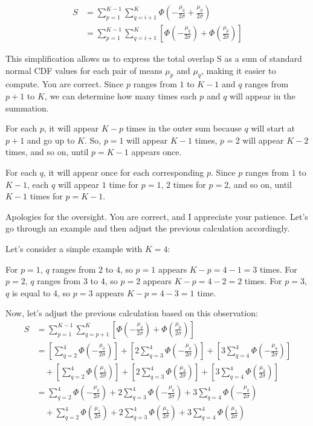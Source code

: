 \documentclass[11pt]{amsart}
\begin{document}
\begin{align*}
S &= \sum_{p=1}^{K-1} \sum_{q=i+1}^K \Phi\left(-\frac{\mu_q}{2 \sigma} + \frac{\mu_p}{2 \sigma}\right) \\
&= \sum_{p=1}^{K-1} \sum_{q=i+1}^K \left[\Phi\left(-\frac{\mu_q}{2 \sigma}\right) + \Phi\left(\frac{\mu_p}{2 \sigma}\right)\right]
\end{align*}

This simplification allows us to express the total overlap S as a sum of standard normal CDF values for each pair of means $\mu_p$ and $\mu_q$, making it easier to compute.
You are correct. Since $p$ ranges from $1$ to $K-1$ and $q$ ranges from $p+1$ to $K$, we can determine how many times each $p$ and $q$ will appear in the summation.

For each $p$, it will appear $K-p$ times in the outer sum because $q$ will start at $p+1$ and go up to $K$. So, $p=1$ will appear $K-1$ times, $p=2$ will appear $K-2$ times, and so on, until $p=K-1$ appears once.

For each $q$, it will appear once for each corresponding $p$. Since $p$ ranges from $1$ to $K-1$, each $q$ will appear $1$ time for $p=1$, $2$ times for $p=2$, and so on, until $K-1$ times for $p=K-1$.


Apologies for the oversight. You are correct, and I appreciate your patience. Let's go through an example and then adjust the previous calculation accordingly.

Let's consider a simple example with $K=4$:

For $p=1$, $q$ ranges from $2$ to $4$, so $p=1$ appears $K-p = 4-1 = 3$ times.
For $p=2$, $q$ ranges from $3$ to $4$, so $p=2$ appears $K-p = 4-2 = 2$ times.
For $p=3$, $q$ is equal to $4$, so $p=3$ appears $K-p = 4-3 = 1$ time.

Now, let's adjust the previous calculation based on this observation:
\begin{align*}
S &= \sum_{p=1}^{K-1} \sum_{q=p+1}^K \left[\Phi\left(-\frac{\mu_q}{2 \sigma}\right) + \Phi\left(\frac{\mu_p}{2 \sigma}\right)\right] \\
&= \left[\sum_{q=2}^4 \Phi\left(-\frac{\mu_q}{2 \sigma}\right)\right] + \left[2 \sum_{q=3}^4 \Phi\left(-\frac{\mu_q}{2 \sigma}\right)\right] + \left[3 \sum_{q=4}^4 \Phi\left(-\frac{\mu_q}{2 \sigma}\right)\right] \\
&\quad + \left[\sum_{q=2}^4 \Phi\left(\frac{\mu_1}{2 \sigma}\right)\right] + \left[2 \sum_{q=3}^4 \Phi\left(\frac{\mu_2}{2 \sigma}\right)\right] + \left[3 \sum_{q=4}^4 \Phi\left(\frac{\mu_3}{2 \sigma}\right)\right] \\
&= \sum_{q=2}^4 \Phi\left(-\frac{\mu_q}{2 \sigma}\right) + 2\sum_{q=3}^4 \Phi\left(-\frac{\mu_q}{2 \sigma}\right) + 3\sum_{q=4}^4 \Phi\left(-\frac{\mu_q}{2 \sigma}\right) \\
&\quad + \sum_{q=2}^4 \Phi\left(\frac{\mu_1}{2 \sigma}\right) + 2\sum_{q=3}^4 \Phi\left(\frac{\mu_2}{2 \sigma}\right) + 3\sum_{q=4}^4 \Phi\left(\frac{\mu_3}{2 \sigma}\right)
\end{align*}
\end{document}
